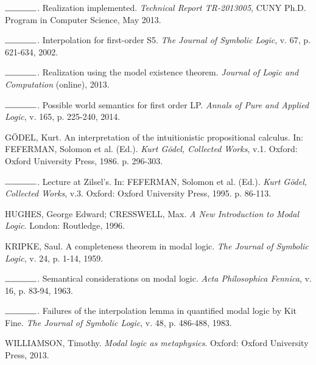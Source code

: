 \documentclass[12pt]{report}
\theoremstyle{definition}
\begin{document}
\begin{thebibliography}{100}
 $\rule{1.30cm}{0.15mm}$. Realization implemented. \textit{Technical Report TR-2013005}, CUNY Ph.D. Program in Computer Science, May 2013.

 $\rule{1.30cm}{0.15mm}$. Interpolation for first-order S5. \textit{The Journal of Symbolic Logic}, v. 67, p. 621-634, 2002.

 $\rule{1.30cm}{0.15mm}$. Realization using the model existence theorem. \textit{Journal of Logic and Computation} (online), 2013.

$\rule{1.30cm}{0.15mm}$. Possible world semantics for first order LP. {\it Annals of Pure and Applied Logic}, v. 165, p. 225-240, 2014.

G\"ODEL, Kurt. An interpretation of the intuitionistic propositional calculus. In: FEFERMAN, Solomon et al. (Ed.). \textit{Kurt G\"odel, Collected Works}, v.1. Oxford: Oxford University Press, 1986. p. 296-303.

$\rule{1.30cm}{0.15mm}$. Lecture at Zilsel’s. In: FEFERMAN, Solomon et al. (Ed.). \textit{Kurt G\"odel, Collected Works}, v.3. Oxford: Oxford University Press, 1995. p. 86-113.



 HUGHES, George Edward; CRESSWELL, Max. \textit{A New Introduction to Modal Logic}. London: Routledge, 1996.

 KRIPKE, Saul. A completeness theorem in modal logic. \textit{The Journal of Symbolic Logic}, v. 24, p. 1-14, 1959.

 $\rule{1.30cm}{0.15mm}$. Semantical considerations on modal logic. \textit{Acta Philosophica Fennica}, v. 16, p. 83-94, 1963.

 $\rule{1.30cm}{0.15mm}$. Failures of the interpolation lemma in quantified modal logic by Kit Fine. \textit{The Journal of Symbolic Logic}, v. 48, p. 486-488, 1983.

 WILLIAMSON, Timothy. \textit{Modal logic as metaphysics}. Oxford: Oxford University Press, 2013. 
\end{thebibliography}
\end{document}
